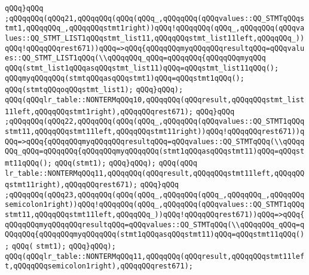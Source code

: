 \verb|qQQq}qQQq|\newline
\verb|;qQQqqQQq(qQQq21,qQQqqQQq(qQQq(qQQq_,qQQqqQQq(qQQqvalues::QQ_STMTqQQqstmt1,qQQqqQQq_,qQQqqQQqstmt1right))qQQq!qQQqqQQq(qQQq_,qQQqqQQq(qQQqvalues::QQ_STMT_LIST1qQQqstmt_list11,qQQqqQQqstmt_list11left,qQQqqQQq_))qQQq!qQQqqQQqrest671))qQQq=>qQQq{qQQqqQQqmyqQQqqQQqresultqQQq=qQQqvalues::QQ_STMT_LIST1qQQq(\\qQQqqQQq_qQQq=qQQqqQQq{qQQqqQQqmyqQQq|\newline
\verb|qQQq(stmt_list1qQQqasqQQqstmt_list11)qQQq=qQQqstmt_list11qQQq();|\newline
\verb|qQQqmyqQQqqQQq(stmtqQQqasqQQqstmt1)qQQq=qQQqstmt1qQQq();|\newline
\verb|qQQq(stmtqQQqoqQQqstmt_list1);|\newline
\verb|qQQq}qQQq);|\newline
\verb|qQQq(qQQqlr_table::NONTERMqQQq10,qQQqqQQq(qQQqresult,qQQqqQQqstmt_list11left,qQQqqQQqstmt1right),qQQqqQQqrest671);|\newline
\verb|qQQq}qQQq|\newline
\verb|;qQQqqQQq(qQQq22,qQQqqQQq(qQQq(qQQq_,qQQqqQQq(qQQqvalues::QQ_STMT1qQQqstmt11,qQQqqQQqstmt11left,qQQqqQQqstmt11right))qQQq!qQQqqQQqrest671))qQQq=>qQQq{qQQqqQQqmyqQQqqQQqresultqQQq=qQQqvalues::QQ_STMTqQQq(\\qQQqqQQq_qQQq=qQQqqQQq{qQQqqQQqmyqQQqqQQq(stmt1qQQqasqQQqstmt11)qQQq=qQQqstmt11qQQq();|\newline
\verb|qQQq(stmt1);|\newline
\verb|qQQq}qQQq);|\newline
\verb|qQQq(qQQq|\newline
\verb|lr_table::NONTERMqQQq11,qQQqqQQq(qQQqresult,qQQqqQQqstmt11left,qQQqqQQqstmt11right),qQQqqQQqrest671);|\newline
\verb|qQQq}qQQq|\newline
\verb|;qQQqqQQq(qQQq23,qQQqqQQq(qQQq(qQQq_,qQQqqQQq(qQQq_,qQQqqQQq_,qQQqqQQqsemicolon1right))qQQq!qQQqqQQq(qQQq_,qQQqqQQq(qQQqvalues::QQ_STMT1qQQqstmt11,qQQqqQQqstmt11left,qQQqqQQq_))qQQq!qQQqqQQqrest671))qQQq=>qQQq{qQQqqQQqmyqQQqqQQqresultqQQq=qQQqvalues::QQ_STMTqQQq(\\qQQqqQQq_qQQq=qQQqqQQq{qQQqqQQqmyqQQqqQQq(stmt1qQQqasqQQqstmt11)qQQq=qQQqstmt11qQQq();|\newline
\verb|qQQq(|\newline
\verb|stmt1);|\newline
\verb|qQQq}qQQq);|\newline
\verb|qQQq(qQQqlr_table::NONTERMqQQq11,qQQqqQQq(qQQqresult,qQQqqQQqstmt11left,qQQqqQQqsemicolon1right),qQQqqQQqrest671);|\newline

